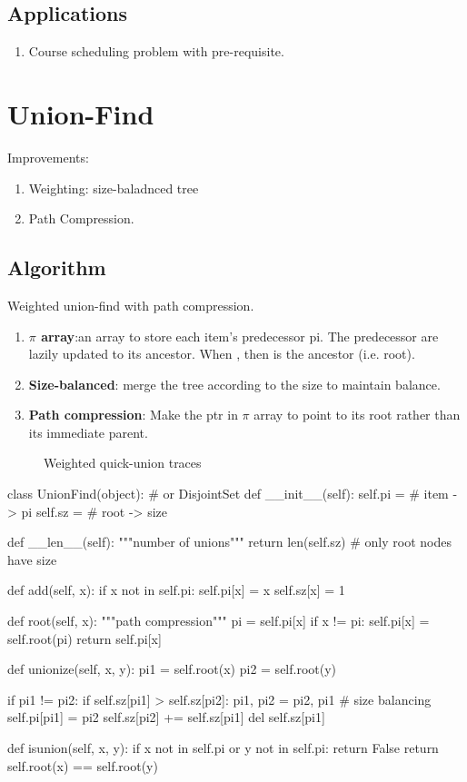 \subsection{Applications}
\begin{enumerate}
\item Course scheduling problem with pre-requisite.
\end{enumerate}

\section{Union-Find}\label{section:unionFind}
Improvements:
\begin{enumerate}
\item Weighting: size-baladnced tree
\item Path Compression.
\end{enumerate}
\subsection{Algorithm}
Weighted union-find with path compression.\\
\begin{enumerate}
\item \textbf{$\pi$ array}:an array to store each item's predecessor pi. The predecessor are lazily updated to its ancestor. When , then  is the ancestor (i.e. root).
\item \textbf{Size-balanced}: merge the tree according to the size to maintain balance.
\item \textbf{Path compression}: Make the ptr in $\pi$ array to point to its root rather than its immediate parent.
\end{enumerate}
\begin{figure}[]
\centering
\subfloat{\texttt{[image: uf]}}
\caption{Weighted quick-union traces}
\label{fig:union_find}
\end{figure}

\begin{python}
class UnionFind(object):  # or DisjointSet
  def __init__(self):
    self.pi = {}  # item -> pi
    self.sz = {}  # root -> size

  def __len__(self):
    """number of unions"""
    return len(self.sz)  # only root nodes have size

  def add(self, x):
    if x not in self.pi:
      self.pi[x] = x
      self.sz[x] = 1

  def root(self, x):
    """path compression"""
    pi = self.pi[x]
    if x != pi:
      self.pi[x] = self.root(pi)
    return self.pi[x]

  def unionize(self, x, y):
    pi1 = self.root(x)
    pi2 = self.root(y)

    if pi1 != pi2:
      if self.sz[pi1] > self.sz[pi2]:
        pi1, pi2 = pi2, pi1
        # size balancing
      self.pi[pi1] = pi2
      self.sz[pi2] += self.sz[pi1]
      del self.sz[pi1]

  def isunion(self, x, y):
    if x not in self.pi or y not in self.pi:
      return False
    return self.root(x) == self.root(y)
\end{python}

